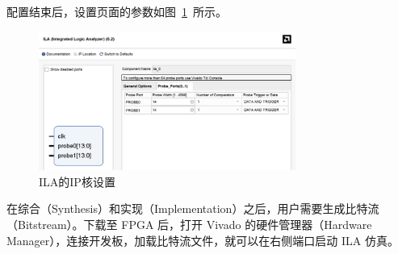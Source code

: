 \documentclass[lang=cn,newtx,10pt,scheme=chinese]{elegantbook}
\begin{document}
配置结束后，设置页面的参数如图~\ref{fig:exp3:ILA}~所示。
\begin{figure}[htbp]
  \centering
  \includegraphics[width=0.75\textwidth]{figure/exp3/ila.png}
  \caption{ILA的IP核设置}
  \label{fig:exp3:ILA}
\end{figure}

在综合（Synthesis）和实现（Implementation）之后，用户需要生成比特流（Bitstream）。下载至 FPGA 后，打开 Vivado 的硬件管理器（Hardware Manager），连接开发板，加载比特流文件，就可以在右侧端口启动 ILA 仿真。
\end{document}
